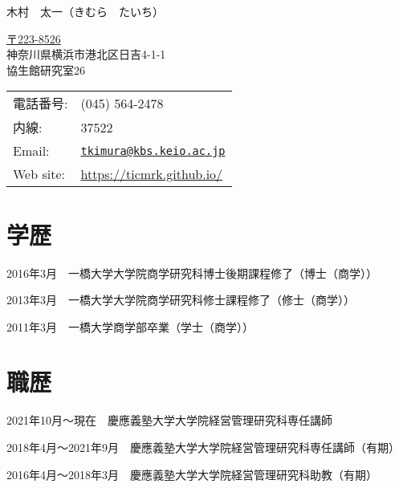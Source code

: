 \documentclass[letterpaper,uplatex]{article}
\def\name{木村　太一}
\renewenvironment{itemize}{
  \begin{list}{}{
    \setlength{\leftmargin}{1.5em}
  }
}{
  \end{list}
}
\begin{document}
{\LARGE \name {\normalsize （きむら　たいち）}}


\vspace{0.25in}

\begin{minipage}{0.45\linewidth}
  \href{}{〒223-8526} \\
  神奈川県横浜市港北区日吉4-1-1 \\
  協生館研究室26
\end{minipage}
\begin{minipage}{0.45\linewidth}
  \begin{tabular}{ll}
    電話番号: & (045) 564-2478 \\
    内線: & 37522\\
    Email: & \href{mailto:tkimura@kbs.keio.ac.jp}{\tt tkimura@kbs.keio.ac.jp}\\
    Web site: & \url{https://ticmrk.github.io/}
  \end{tabular}
\end{minipage}

\section*{学歴}

\begin{itemize}
  \item 2016年3月　一橋大学大学院商学研究科博士後期課程修了（博士（商学））
  \item 2013年3月　一橋大学大学院商学研究科修士課程修了（修士（商学））
  \item 2011年3月　一橋大学商学部卒業（学士（商学））
\end{itemize}

\section*{職歴}

\begin{itemize}
     \item 2021年10月〜現在　慶應義塾大学大学院経営管理研究科専任講師
     \item 2018年4月〜2021年9月　慶應義塾大学大学院経営管理研究科専任講師（有期）
     \item 2016年4月〜2018年3月　慶應義塾大学大学院経営管理研究科助教（有期）
\end{itemize}
\end{document}
